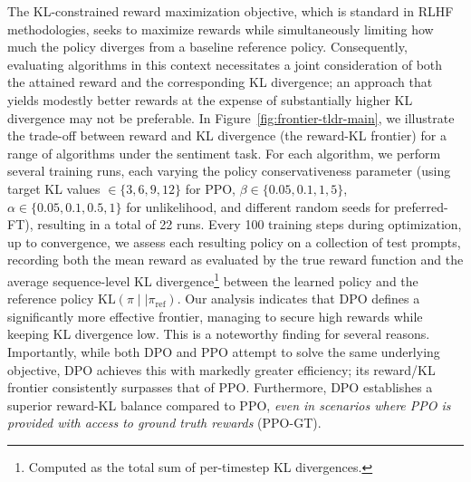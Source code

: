 The KL-constrained reward maximization objective, which is standard in RLHF methodologies, seeks to maximize rewards while simultaneously limiting how much the policy diverges from a baseline reference policy. Consequently, evaluating algorithms in this context necessitates a joint consideration of both the attained reward and the corresponding KL divergence; an approach that yields modestly better rewards at the expense of substantially higher KL divergence may not be preferable. In Figure~\ref{fig:frontier-tldr-main}, we illustrate the trade-off between reward and KL divergence (the reward-KL frontier) for a range of algorithms under the sentiment task. For each algorithm, we perform several training runs, each varying the policy conservativeness parameter (using target KL values $\in\{3,6,9,12\}$ for PPO, $\beta \in \{0.05,0.1,1,5\}$, $\alpha\in\{0.05,0.1,0.5,1\}$ for unlikelihood, and different random seeds for preferred-FT), resulting in a total of 22 runs. Every 100 training steps during optimization, up to convergence, we assess each resulting policy on a collection of test prompts, recording both the mean reward as evaluated by the true reward function and the average sequence-level KL divergence\footnote{Computed as the total sum of per-timestep KL divergences.} between the learned policy and the reference policy $\text{KL}\left(\pi\mid \mid \pi_\text{ref}\right)$. Our analysis indicates that DPO defines a significantly more effective frontier, managing to secure high rewards while keeping KL divergence low. This is a noteworthy finding for several reasons. Importantly, while both DPO and PPO attempt to solve the same underlying objective, DPO achieves this with markedly greater efficiency; its reward/KL frontier consistently surpasses that of PPO. Furthermore, DPO establishes a superior reward-KL balance compared to PPO, \emph{even in scenarios where PPO is provided with access to ground truth rewards} (PPO-GT).


